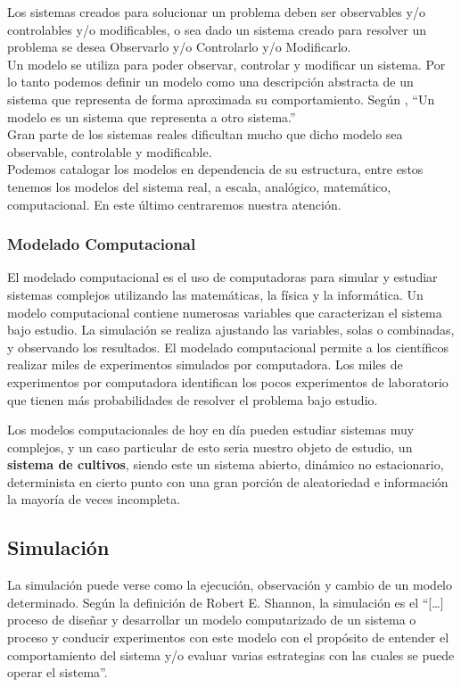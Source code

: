 Los sistemas creados para solucionar un problema deben ser observables y/o controlables y/o modificables, o sea dado un sistema creado para resolver un problema se desea Observarlo y/o Controlarlo y/o Modificarlo. \parencite{temasdesimulacion}\\

Un modelo se utiliza para poder observar, controlar y modificar un sistema. Por lo tanto podemos definir un modelo como una descripción abstracta de un sistema que representa de forma aproximada su comportamiento.
Según \parencite{temasdesimulacion}, “Un modelo es un sistema que representa a otro sistema.”\\

Gran parte de los sistemas reales dificultan mucho que dicho modelo sea observable, controlable y modificable.\\

Podemos catalogar los modelos en dependencia de su estructura, entre estos tenemos los modelos del sistema real, a escala, analógico, matemático, computacional. En este último centraremos nuestra atención.\\

\subsubsection{Modelado Computacional}
El modelado computacional es el uso de computadoras para simular y estudiar sistemas complejos utilizando las matemáticas, la física y la informática. Un modelo computacional contiene numerosas variables que caracterizan el sistema bajo estudio. La simulación se realiza ajustando las variables, solas o combinadas, y observando los resultados. El modelado computacional permite a los científicos realizar miles de experimentos simulados por computadora. Los miles de experimentos por computadora identifican los pocos experimentos de laboratorio que tienen más probabilidades de resolver el problema bajo estudio. \parencite{noauthor_modelado_nodate}

Los modelos computacionales de hoy en día pueden estudiar sistemas muy complejos, y un caso particular de esto seria nuestro objeto de estudio, un \textbf{sistema de cultivos}, siendo este un sistema abierto, dinámico no estacionario, determinista en cierto punto con una gran porción de aleatoriedad e información la mayoría de veces incompleta. \\

\subsection{Simulación}
La simulación puede verse como la ejecución, observación y cambio de un modelo determinado.
Según la definición de Robert E. Shannon, \parencite{shannon1975simulacion} la simulación es el “[…] proceso de diseñar y desarrollar un modelo computarizado de un sistema o proceso y conducir experimentos con este modelo con el propósito de entender el comportamiento del sistema y/o evaluar varias estrategias con las cuales se puede operar el sistema”.\\

